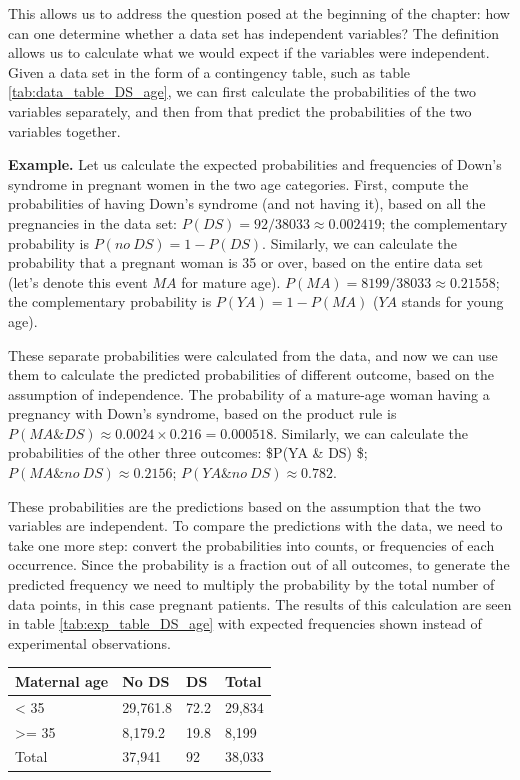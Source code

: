 \documentclass[
]{book}
\theoremstyle{definition}
\theoremstyle{definition}
\theoremstyle{definition}
\theoremstyle{remark}
\begin{document}
This allows us to address the question posed at the beginning of the chapter: how can one determine whether a data set has independent variables? The definition allows us to calculate what we would expect if the variables were independent. Given a data set in the form of a contingency table, such as table \ref{tab:data_table_DS_age}, we can first calculate the probabilities of the two variables separately, and then from that predict the probabilities of the two variables together.

\textbf{Example.} Let us calculate the expected probabilities and frequencies of Down's syndrome in pregnant women in the two age categories. First, compute the probabilities of having Down's syndrome (and not having it), based on all the pregnancies in the data set: \(P(DS) = 92/38033 \approx 0.002419\); the complementary probability is \(P(no \ DS) = 1 - P(DS)\). Similarly, we can calculate the probability that a pregnant woman is 35 or over, based on the entire data set (let's denote this event \(MA\) for mature age). \(P(MA) = 8199/38033 \approx 0.21558\); the complementary probability is \(P(YA) = 1 - P(MA)\) (\(YA\) stands for young age).

These separate probabilities were calculated from the data, and now we can use them to calculate the predicted probabilities of different outcome, based on the assumption of independence. The probability of a mature-age woman having a pregnancy with Down's syndrome, based on the product rule is \(P(MA \& DS) \approx 0.0024 \times 0.216 = 0.000518\). Similarly, we can calculate the probabilities of the other three outcomes: \$P(YA \& DS)  \$; \(P(MA \& no \ DS) \approx 0.2156\); \(P(YA \& no \ DS) \approx 0.782\).

These probabilities are the predictions based on the assumption that the two variables are independent. To compare the predictions with the data, we need to take one more step: convert the probabilities into counts, or frequencies of each occurrence. Since the probability is a fraction out of all outcomes, to generate the predicted frequency we need to multiply the probability by the total number of data points, in this case pregnant patients. The results of this calculation are seen in table \ref{tab:exp_table_DS_age} with expected frequencies shown instead of experimental observations.

\begin{longtable}[]{@{}llll@{}}
\toprule
Maternal age & No DS & DS & Total\tabularnewline
\midrule
\endhead
\textless{} 35 & 29,761.8 & 72.2 & 29,834\tabularnewline
\textgreater= 35 & 8,179.2 & 19.8 & 8,199\tabularnewline
Total & 37,941 & 92 & 38,033\tabularnewline
\bottomrule
\end{longtable}
\end{document}
